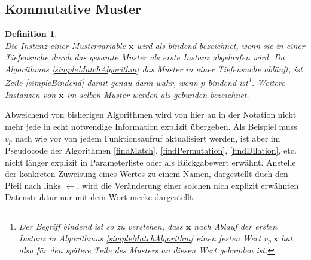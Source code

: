 \subsection{Kommutative Muster} \label{subsecACMuster}

\newtheorem{defBindend}[bsp]{Definition}
\begin{defBindend}~\\
Die Instanz einer Mustervariable $\mathbf x$ wird als \emph{bindend}  bezeichnet, wenn sie in einer Tiefensuche durch das gesamte Muster als erste Instanz abgelaufen wird. Da Algorithmus \ref{simpleMatchAlgorithm} das Muster in einer Tiefensuche abläuft, ist Zeile \ref{simpleBindend} damit genau dann wahr, wenn $p$ bindend ist\footnote{Der Begriff \emph{bindend} ist so zu verstehen, dass $\mathbf x$ nach Ablauf der ersten Instanz in Algorithmus \ref{simpleMatchAlgorithm} einen festen Wert $v_p~\mathbf x$ hat, also für den spätere Teile des Musters an diesen Wert gebunden ist.}. Weitere Instanzen von $\mathbf x$ im selben Muster werden als \emph{gebunden} bezeichnet.
\end{defBindend}

Abweichend von bisherigen Algorithmen wird von hier an in der Notation nicht mehr jede in echt notwendige Information explizit übergeben. Als Beispiel muss $v_p$ nach wie vor von jedem Funktionsaufruf aktualisiert werden, ist aber im Pseudocode der Algorithmen \ref{findMatch}, \ref{findPermutation}, \ref{findDilation}, etc. nicht länger explizit in Parameterliste oder als Rückgabewert erwähnt.
Anstelle der konkreten Zuweisung eines Wertes zu einem Namen, dargestellt duch den Pfeil nach links \glqq $\leftarrow$\grqq{}, wird die Veränderung einer solchen nich explizit erwähnten Datenstruktur nur mit dem Wort \glqq merke\grqq{} dargestellt.
 
\begin{algorithm}
\DontPrintSemicolon
\caption{$\mathrm{findMatch} \colon M \times T \rightarrow \mathit{Bool}$}\label{findMatch}

 {
}
\end{algorithm}

